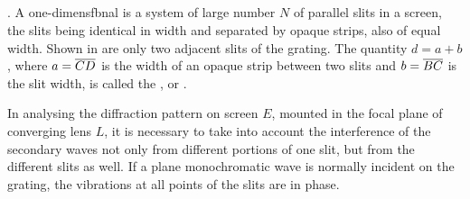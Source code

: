 \subsection{}\label{33.3.4}  . A one-dimensfbnal  is a system of large number $N$ of parallel slits in a screen, the slits being identical in width and separated by opaque strips, also of equal width. Shown in  are only two adjacent slits of the grating. The quantity $d = a + b$, where $a = \overline{CD}$ is the width of an opaque strip between two slits
and $b = \overline{BC}$ is the slit width, is called the , or .

In analysing the diffraction pattern on screen $E$, mounted in
the focal plane of converging lens $L$, it is necessary to take into account the interference of the secondary waves not only from different portions of one slit, but from the different slits as well. If a plane monochromatic wave is normally incident on the grating, the vibrations at all points of the slits are in phase.

